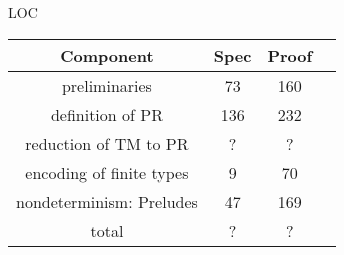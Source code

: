 \documentclass[11pt,usenames,dvipsnames,
hyperref={pdfencoding=auto,psdextra}]{beamer}
\makeatletter
\def\beamer@writeslidentry@miniframesoff{%
  \expandafter\beamer@ifempty\expandafter{\beamer@framestartpage}{}%
  {%
    \clearpage\beamer@notesactions%
  }
}
\newcommand*{\miniframesoff}{\let\beamer@writeslidentry=\beamer@writeslidentry@miniframesoff}
\makeatother
\begin{document}
\miniframesoff
\section{}

\begin{frame}{LOC}
  \begin{center}
  \begin{tabular}{cccc}
    Component & Spec & Proof \\
    \midrule
    preliminaries & 73 & 160 \\
    definition of PR & 136 & 232 \\
    reduction of TM to PR & ? & ? \\
    encoding of finite types & 9 & 70 \\
    nondeterminism: Preludes & 47 & 169 \\
    \midrule
    total & ? & ?
  \end{tabular}
  \end{center}
\end{frame}
\end{document}
